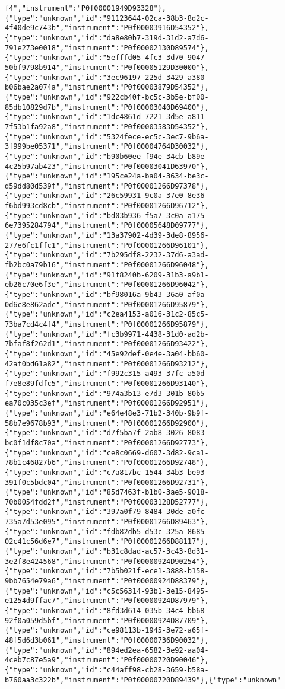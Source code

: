 \begin{verbatim}
f4","instrument":"P0f00001949D93328"},{"type":"unknown","id":"91123644-02ca-38b3-8d2c-4f40de9c743b","instrument":"P0f00003916D54352"},{"type":"unknown","id":"da8e80b7-319d-31d2-a7d6-791e273e0018","instrument":"P0f00002130D89574"},{"type":"unknown","id":"5efffd05-4fc3-3d70-9047-50bf9798b914","instrument":"P0f00005129D30000"},{"type":"unknown","id":"3ec96197-225d-3429-a380-b06bae2a074a","instrument":"P0f00003879D54352"},{"type":"unknown","id":"922cb40f-bc5c-3b5e-bf00-85db10829d7b","instrument":"P0f00003040D69400"},{"type":"unknown","id":"1dc4861d-7221-3d5e-a811-7f53b1fa92a8","instrument":"P0f00003583D54352"},{"type":"unknown","id":"5324fece-ec5c-3ec7-9b6a-3f999be05371","instrument":"P0f00004764D30032"},{"type":"unknown","id":"b90b60ee-f94e-34cb-b89e-4c25b97ab423","instrument":"P0f00003041D63970"},{"type":"unknown","id":"195ce24a-ba04-3634-be3c-d59dd80d539f","instrument":"P0f00001266D97378"},{"type":"unknown","id":"26c59931-9c0a-37e0-8e36-f6bd993cd8cb","instrument":"P0f00001266D96712"},{"type":"unknown","id":"bd03b936-f5a7-3c0a-a175-6e7395284794","instrument":"P0f00005648D09777"},{"type":"unknown","id":"13a37902-4d39-3de8-8956-277e6fc1ffc1","instrument":"P0f00001266D96101"},{"type":"unknown","id":"7b295df8-2232-37d6-a3ad-fb2bc0a79b16","instrument":"P0f00001266D96048"},{"type":"unknown","id":"91f8240b-6209-31b3-a9b1-eb26c70e6f3e","instrument":"P0f00001266D96042"},{"type":"unknown","id":"bf98016a-9b43-36a0-af0a-0d6c8e862adc","instrument":"P0f00001266D95879"},{"type":"unknown","id":"c2ea4153-a016-31c2-85c5-73ba7cd4c4f4","instrument":"P0f00001266D95879"},{"type":"unknown","id":"fc3b9971-4438-31d0-ad2b-7bfaf8f262d1","instrument":"P0f00001266D93422"},{"type":"unknown","id":"45e92def-0e4e-3a04-bb60-42af0bd61a82","instrument":"P0f00001266D93212"},{"type":"unknown","id":"f992c315-a493-37fc-a50d-f7e8e89fdfc5","instrument":"P0f00001266D93140"},{"type":"unknown","id":"974a3b13-e7d3-301b-80b5-ea70c035c3ef","instrument":"P0f00001266D92951"},{"type":"unknown","id":"e64e48e3-71b2-340b-9b9f-58b7e9678b93","instrument":"P0f00001266D92900"},{"type":"unknown","id":"d7f5ba7f-2ab8-3026-8083-bc0f1df8c70a","instrument":"P0f00001266D92773"},{"type":"unknown","id":"ce8c0669-d607-3d82-9ca1-78b1c46827b6","instrument":"P0f00001266D92748"},{"type":"unknown","id":"c7a817bc-1544-34b3-be93-391f0c5bdc04","instrument":"P0f00001266D92731"},{"type":"unknown","id":"85d7463f-b1b0-3ae5-9018-70b0054fdd2f","instrument":"P0f00003128D52777"},{"type":"unknown","id":"397a0f79-8484-30de-a0fc-735a7d53e095","instrument":"P0f00001266D89463"},{"type":"unknown","id":"fdb82db5-d53c-325a-8685-02c41c56d6e7","instrument":"P0f00001266D88117"},{"type":"unknown","id":"b31c8dad-ac57-3c43-8d31-3e2f8e424568","instrument":"P0f00000924D90254"},{"type":"unknown","id":"7b5b021f-ece1-3888-b158-9bb7654e79a6","instrument":"P0f00000924D88379"},{"type":"unknown","id":"c5c56314-93b1-3e15-8495-e1254d9ffac7","instrument":"P0f00000924D87979"},{"type":"unknown","id":"8fd3d614-035b-34c4-bb68-92f0a059d5bf","instrument":"P0f00000924D87709"},{"type":"unknown","id":"ce98113b-1945-3e72-a65f-48f5d6d3b061","instrument":"P0f00000736D90032"},{"type":"unknown","id":"894ed2ea-6582-3e92-aa04-4ceb7c87e5a9","instrument":"P0f00000720D90046"},{"type":"unknown","id":"c44aff98-cb28-3659-b58a-b760aa3c322b","instrument":"P0f00000720D89439"},{"type":"unknown"
\end{verbatim}
